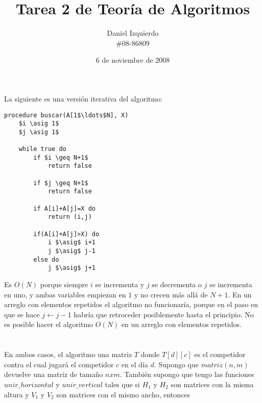 \documentclass{article}
\newcommand{\asig}{\ensuremath{\leftarrow}}
\begin{document}

\title{Tarea 2 de Teoría de Algoritmos}
\author{Daniel Izquierdo \\ \#08-86809}
\date{6 de noviembre de 2008}

\maketitle

\section{}

La siguiente es una versión iterativa del algoritmo:

\begin{lstlisting}[caption={Solución al ejercicio 1},label=alg:ejercicio1]
procedure buscar(A[1$\ldots$N], X)
    $i \asig 1$
    $j \asig 1$

    while true do
        if $i \geq N+1$
            return false

        if $j \geq N+1$
            return false

        if A[i]+A[j]=X do
            return (i,j)

        if(A[i]+A[j]>X) do
            i $\asig$ i+1
            j $\asig$ j-1
        else do
            j $\asig$ j+1
\end{lstlisting}

Es $O(N)$ porque siempre $i$ se incrementa y $j$ se decrementa o $j$ se incrementa en uno, y ambas
variables empiezan en $1$ y no crecen más allá de $N+1$. En un arreglo con elementos repetidos
el algoritmo no funcionaría, porque en el paso en que se hace $j $\asig$ j-1$ habría que
retroceder posiblemente hasta el principio. No es posible hacer el algoritmo $O(N)$ en un
arreglo con elementos repetidos.

\section{}

En ambos casos, el algoritmo una matriz $T$ donde $T[d][c]$
es el competidor contra el cual
jugará el competidor $c$ en el día $d$.
Supongo que
$matriz(n,m)$ devuelve una matriz de tamaño $n x m$. También supongo que tengo las funciones
$unir\_horizontal$ y $unir\_vertical$ tales que si $H_1$ y $H_2$ son matrices con la misma altura
y $V_1$ y $V_2$ son matrices con el mismo ancho, entonces
\end{document}
